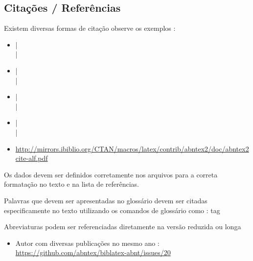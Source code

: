 \subsection{Citações / Referências}

Existem diversas formas de citação observe os exemplos :

\begin{itemize}
    \item \cite{UML:JACOBSON} | \cite{POWELL:2006} \\ 
        \cite{SCRUMGUIDE:2013} | \cite{urani1994}

    \item {} |  \\
         | 

    \item {}|  \\
         | 

    \item \citeauthor{UML:JACOBSON}| \citeauthor{POWELL:2006} \\
        \citeauthor{SCRUMGUIDE:2013}| \citeauthor{urani1994}
        
    \item \url{http://mirrors.ibiblio.org/CTAN/macros/latex/contrib/abntex2/doc/abntex2cite-alf.pdf}
\end{itemize}

Os dados devem ser definidos corretamente nos arquivos  para a correta formatação no texto e na lista de referências.

Palavras que devem ser apresentadas no glossário devem ser citadas especificamente no texto utilizando os comandos de glossário como : \gls{tag}


Abreviaturas podem ser referenciadas diretamente 
na versão reduzida  \space  
ou longa 

\begin{itemize}
    \item Autor com diversas publicações no mesmo ano : \url{https://github.com/abntex/biblatex-abnt/issues/20}
\end{itemize}